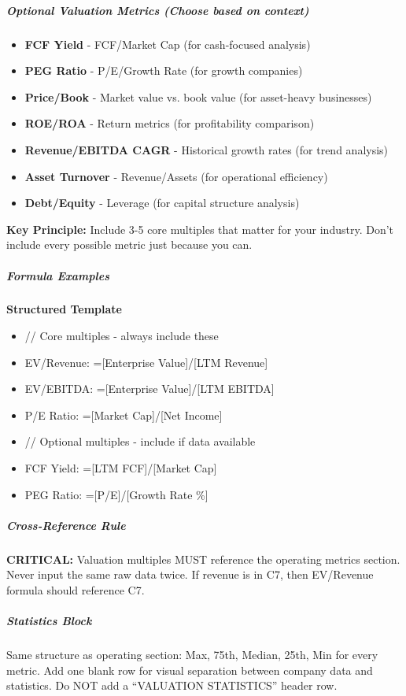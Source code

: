 \documentclass[11pt]{article}
\begin{document}
\subparagraph{Optional Valuation Metrics (Choose based on context)}\mbox{}\par
\begin{itemize}[leftmargin=*,itemsep=2pt,topsep=2pt]
\item {} \textbf{FCF Yield} - FCF/Market Cap (for cash-focused analysis)
\item {} \textbf{PEG Ratio} - P/E/Growth Rate (for growth companies)
\item {} \textbf{Price/Book} - Market value vs. book value (for asset-heavy businesses)
\item {} \textbf{ROE/ROA} - Return metrics (for profitability comparison)
\item {} \textbf{Revenue/EBITDA CAGR} - Historical growth rates (for trend analysis)
\item {} \textbf{Asset Turnover} - Revenue/Assets (for operational efficiency)
\item {} \textbf{Debt/Equity} - Leverage (for capital structure analysis)
\end{itemize}

\textbf{Key Principle:} Include 3-5 core multiples that matter for your industry. Don't include every possible metric just because you can.


\subparagraph{Formula Examples}\mbox{}\par
\textbf{Structured Template}
\begin{itemize}[leftmargin=*,itemsep=2pt,topsep=2pt]
\item {} // Core multiples - always include these
\item {} EV/Revenue: =[Enterprise Value]/[LTM Revenue]
\item {} EV/EBITDA: =[Enterprise Value]/[LTM EBITDA]
\item {} P/E Ratio: =[Market Cap]/[Net Income]
\item {} // Optional multiples - include if data available
\item {} FCF Yield: =[LTM FCF]/[Market Cap]
\item {} PEG Ratio: =[P/E]/[Growth Rate \%]
\end{itemize}

\subparagraph{Cross-Reference Rule}\mbox{}\par
\textbf{CRITICAL:} Valuation multiples MUST reference the operating metrics section. Never input the same raw data twice. If revenue is in C7, then EV/Revenue formula should reference C7.


\subparagraph{Statistics Block}\mbox{}\par
Same structure as operating section: Max, 75th, Median, 25th, Min for every metric. Add one blank row for visual separation between company data and statistics. Do NOT add a ``VALUATION STATISTICS'' header row.
\end{document}
